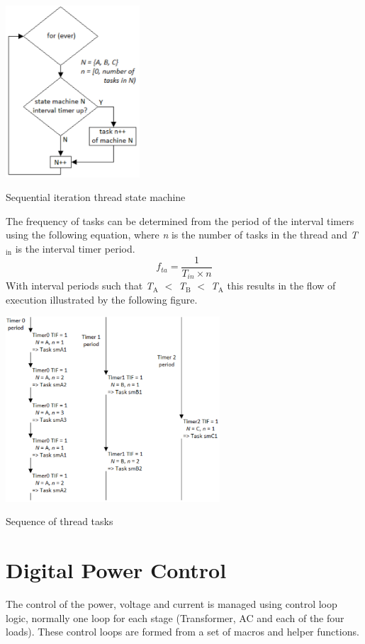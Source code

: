\begin{DoxyImage}
\includegraphics[width=5cm]{state_machine_loop}
\caption{Sequential iteration thread state machine}
\end{DoxyImage}


The frequency of tasks can be determined from the period of the interval timers using the following equation, where {\itshape n} is the number of tasks in the thread and {\itshape T$_{\mbox{in}}$ } is the interval timer period. \[ f_{ta}= \frac{1}{T_{in} \times n} \] With interval periods such that {\itshape T$_{\mbox{A}}$ } {\ttfamily $<$} {\itshape T$_{\mbox{B}}$ } {\ttfamily $<$} {\itshape T$_{\mbox{A}}$ } this results in the flow of execution illustrated by the following figure.


\begin{DoxyImage}
\includegraphics[width=8cm]{seq_state_machine_task_itr}
\caption{Sequence of thread tasks}
\end{DoxyImage}
\hypertarget{index_dpctrl}{}\section{Digital Power Control}\label{index_dpctrl}
The control of the power, voltage and current is managed using control loop logic, normally one loop for each stage (Transformer, A\-C and each of the four loads). These control loops are formed from a set of macros and helper functions.

